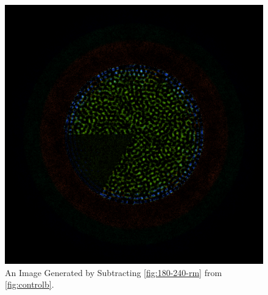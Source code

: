\begin{figure}[H]
\centering
\includegraphics[width=0.6\linewidth]{figures/180-240/diff-180-240}
\caption{An Image Generated by Subtracting \ref{fig:180-240-rm} from \ref{fig:controlb}.}
\label{fig:180-240-diff}
\end{figure}